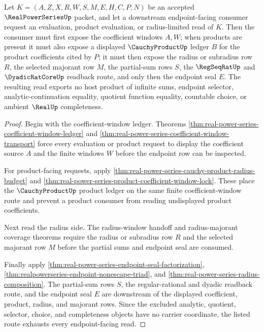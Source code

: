 \begin{theorem}
\label{thm:realpowerseries-coefficient-product-radius-exhaustion}
Let $K=(A,Z,X,R,W,S,M,E,H,C,P,N)$ be an accepted $\RealPowerSeriesUp$ packet, and let a downstream endpoint-facing consumer request an evaluation, product evaluation, or radius-limited read of $K$. Then the consumer must first expose the coefficient windows $A,W$; when products are present it must also expose a displayed $\CauchyProductUp$ ledger $B$ for the product coefficients cited by $P$; it must then expose the radius or subradius row $R$, the selected majorant row $M$, the partial-sum rows $S$, the $\RegSeqRatUp$ and $\DyadicRatCoreUp$ readback route, and only then the endpoint seal $E$. The resulting read exports no host product of infinite sums, endpoint selector, analytic-continuation equality, quotient function equality, countable choice, or ambient $\RealUp$ completeness.
\end{theorem}
\begin{proof}
Begin with the coefficient-window ledger. Theorems \autoref{thm:real-power-series-coefficient-window-ledger} and \autoref{thm:real-power-series-coefficient-window-transport} force every evaluation or product request to display the coefficient source $A$ and the finite windows $W$ before the endpoint row can be inspected.

For product-facing requests, apply \autoref{thm:real-power-series-cauchy-product-radius-budget} and \autoref{thm:real-power-series-product-coefficient-window-lock}. These place the $\CauchyProductUp$ product ledger on the same finite coefficient-window route and prevent a product consumer from reading undisplayed product coefficients.

Next read the radius side. The radius-window handoff and radius-majorant coverage theorems require the radius or subradius row $R$ and the selected majorant row $M$ before the partial sums and endpoint seal are consumed.

Finally apply \autoref{thm:real-power-series-endpoint-seal-factorization}, \autoref{thm:realpowerseries-endpoint-nonescape-triad}, and \autoref{thm:real-power-series-radius-composition}. The partial-sum rows $S$, the regular-rational and dyadic readback route, and the endpoint seal $E$ are downstream of the displayed coefficient, product, radius, and majorant rows. Since the excluded analytic, quotient, selector, choice, and completeness objects have no carrier coordinate, the listed route exhausts every endpoint-facing read.
\end{proof}

